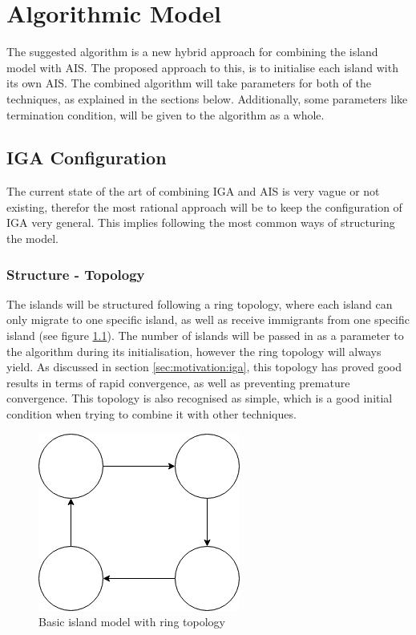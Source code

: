 \chapter{Algorithmic Model}
\label{sec:architectureAndModel}
The suggested algorithm is a new hybrid approach for combining the island model with AIS. The proposed approach to this, is to initialise each island with its own AIS. The combined algorithm will take parameters for both of the techniques, as explained in the sections below. Additionally, some parameters like termination condition, will be given to the algorithm as a whole.

\section{IGA Configuration}


The current state of the art of combining IGA and AIS is very vague or not existing, therefor the most rational approach will be to keep the configuration of IGA very general. This implies following the most common ways of structuring the model.

\subsection{Structure - Topology}
The islands will be structured following a ring topology, where each island can only migrate to one specific island, as well as receive immigrants from one specific island (see figure \ref{fig:iga:ring-model}). The number of islands will be passed in as a parameter to the algorithm during its initialisation, however the ring topology will always yield. As discussed in section \ref{sec:motivation:iga}, this topology has proved good results in terms of rapid convergence, as well as preventing premature convergence. This topology is also recognised as simple, which is a good initial condition when trying to combine it with other techniques.    


\begin{figure}
    \centering
    \includegraphics[width=0.3\columnwidth]{figs/ring-model.png}
    \caption{Basic island model with ring topology}
    \label{fig:iga:ring-model}
\end{figure}

